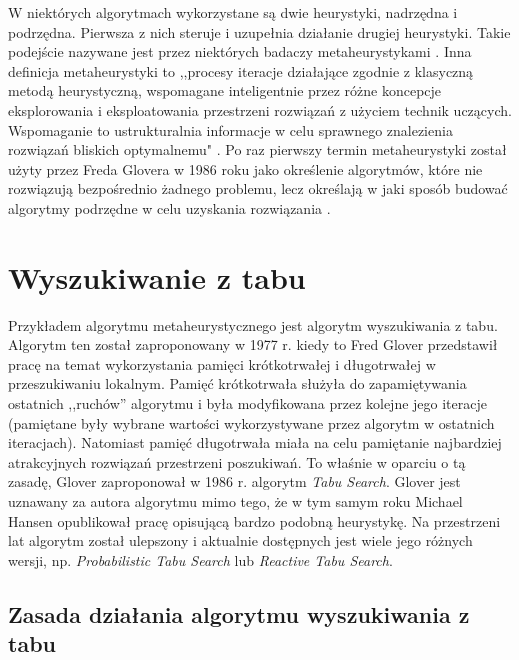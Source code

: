 W niektórych algorytmach wykorzystane są dwie heurystyki, nadrzędna i podrzędna. Pierwsza z nich steruje i uzupełnia działanie drugiej heurystyki. Takie podejście nazywane jest przez niektórych badaczy metaheurystykami \cite{Algorytmy:Widuch}. Inna definicja metaheurystyki to ,,procesy iteracje działające zgodnie z klasyczną metodą heurystyczną, wspomagane inteligentnie przez różne koncepcje eksplorowania i eksploatowania przestrzeni rozwiązań z użyciem technik uczących. Wspomaganie to ustrukturalnia informacje w celu sprawnego znalezienia rozwiązań bliskich optymalnemu" \cite{Metaheurystyki:Osman}. Po raz pierwszy termin metaheurystyki został użyty przez Freda Glovera w 1986 roku jako określenie algorytmów, które nie rozwiązują bezpośrednio żadnego problemu, lecz określają w jaki sposób budować algorytmy podrzędne w celu uzyskania rozwiązania \cite{Future:Glover}.

\section{Wyszukiwanie z tabu}

Przykładem algorytmu metaheurystycznego jest algorytm wyszukiwania z tabu. Algorytm ten został zaproponowany w 1977 r. kiedy to Fred Glover przedstawił pracę na temat wykorzystania pamięci krótkotrwałej i długotrwałej w przeszukiwaniu lokalnym. Pamięć krótkotrwała służyła do zapamiętywania ostatnich ,,ruchów'' algorytmu i była modyfikowana przez kolejne jego iteracje (pamiętane były wybrane wartości wykorzystywane przez algorytm w ostatnich iteracjach). Natomiast pamięć długotrwała miała na celu pamiętanie najbardziej atrakcyjnych rozwiązań przestrzeni poszukiwań. To właśnie w oparciu o tą zasadę, Glover zaproponował w 1986 r. algorytm \textit{Tabu Search}. Glover jest uznawany za autora algorytmu mimo tego, że w tym samym roku Michael Hansen opublikował pracę opisującą bardzo podobną heurystykę. Na przestrzeni lat algorytm został ulepszony i aktualnie dostępnych jest wiele jego różnych wersji, np. \textit{Probabilistic Tabu Search} lub \textit{Reactive Tabu Search}.

\subsection{Zasada działania algorytmu wyszukiwania z tabu}

